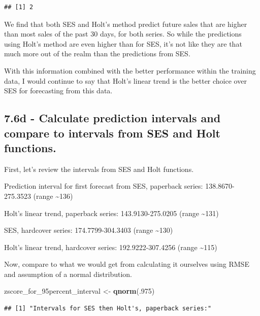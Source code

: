 \documentclass[]{book}
\newenvironment{Shaded}{\begin{snugshade}}{\end{snugshade}}
\newcommand{\DecValTok}[1]{\textcolor[rgb]{0.00,0.00,0.81}{#1}}
\newcommand{\KeywordTok}[1]{\textcolor[rgb]{0.13,0.29,0.53}{\textbf{#1}}}
\newcommand{\NormalTok}[1]{#1}
\newcommand{\StringTok}[1]{\textcolor[rgb]{0.31,0.60,0.02}{#1}}
\begin{document}
\begin{verbatim}
## [1] 2
\end{verbatim}

We find that both SES and Holt's method predict future sales that are higher than most sales of the past 30 days, for both series. So while the predictions using Holt's method are even higher than for SES, it's not like they are that much more out of the realm than the predictions from SES.

With this information combined with the better performance within the training data, I would continue to say that Holt's linear trend is the better choice over SES for forecasting from this data.

\hypertarget{d---calculate-prediction-intervals-and-compare-to-intervals-from-ses-and-holt-functions.}{%
\subsection{7.6d - Calculate prediction intervals and compare to intervals from SES and Holt functions.}\label{d---calculate-prediction-intervals-and-compare-to-intervals-from-ses-and-holt-functions.}}

First, let's review the intervals from SES and Holt functions.

Prediction interval for first forecast from SES, paperback series: 138.8670-275.3523 (range \textasciitilde{}136)

Holt's linear trend, paperback series: 143.9130-275.0205 (range \textasciitilde{}131)

SES, hardcover series: 174.7799-304.3403 (range \textasciitilde{}130)

Holt's linear trend, hardcover series: 192.9222-307.4256 (range \textasciitilde{}115)

Now, compare to what we would get from calculating it ourselves using RMSE and assumption of a normal distribution.

\begin{Shaded}
\begin{Highlighting}[]
\NormalTok{zscore_for_95percent_interval <-}\StringTok{ }\KeywordTok{qnorm}\NormalTok{(.}\DecValTok{975}\NormalTok{)}
\end{Highlighting}
\end{Shaded}

\begin{verbatim}
## [1] "Intervals for SES then Holt's, paperback series:"
\end{verbatim}
\end{document}

